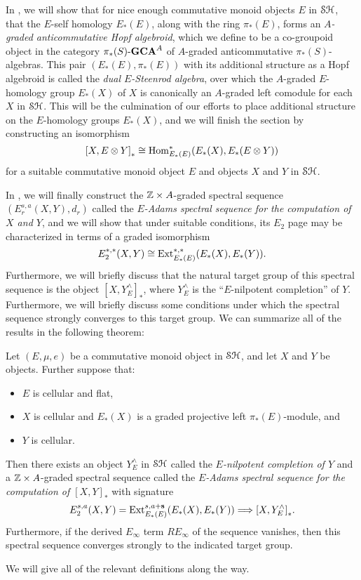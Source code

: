 \documentclass[../main.tex]{subfiles}
\begin{document}
In , we will show that for nice enough commutative monoid objects $E$ in $\mathcal{SH}$, that the $E$-self homology $E_*(E)$, along with the ring $\pi_*(E)$, forms an \emph{$A$-graded anticommutative Hopf algebroid}, which we define to be a co-groupoid object in the category $\pi_*(S)\text-\mathbf{GCA}^A$ of $A$-graded anticommutative $\pi_*(S)$-algebras. This pair $(E_*(E),\pi_*(E))$ with its additional structure as a Hopf algebroid is called the \emph{dual $E$-Steenrod algebra}, over which the $A$-graded $E$-homology group $E_*(X)$ of $X$ is canonically an $A$-graded left comodule for each $X$ in $\mathcal{SH}$. This will be the culmination of our efforts to place additional structure on the $E$-homology groups $E_*(X)$, and we will finish the section by constructing an isomorphism
\[{[X,E\otimes Y]}_*\cong\mathrm{Hom}^*_{E_*(E)}(E_*(X),E_*(E\otimes Y))\]
for a suitable commutative monoid object $E$ and objects $X$ and $Y$ in $\mathcal{SH}$.

In , we will finally construct the $\mathbb{Z}\times A$-graded spectral sequence $(E_r^{s,a}(X,Y),d_r)$ called the \emph{$E$-Adams spectral sequence for the computation of $X$ and $Y$}, and we will show that under suitable conditions, its $E_2$ page may be characterized in terms of a graded isomorphism
\[E_2^{*,*}(X,Y)\cong\mathrm{Ext}_{E_*(E)}^{*,*}(E_{*}(X),E_*(Y)).\]
Furthermore, we will briefly discuss that the natural target group of this spectral sequence is the object ${[X,Y_E^\wedge]}_*$, where $Y_E^\wedge$ is the ``$E$-nilpotent completion'' of $Y$. Furthermore, we will briefly discuss some conditions under which the spectral sequence strongly converges to this target group. We can summarize all of the results in the following theorem:
\begin{theorem}
    Let $(E,\mu,e)$ be a commutative monoid object in $\mathcal{SH}$, and let $X$ and $Y$ be objects. Further suppose that:\begin{itemize}
        \item $E$ is cellular and flat,
        \item $X$ is cellular and $E_*(X)$ is a graded projective left $\pi_*(E)$-module, and
        \item $Y$ is cellular.
    \end{itemize}
    Then there exists an object $Y^\wedge_E$ in $\mathcal{SH}$ called the \emph{$E$-nilpotent completion of $Y$} and a $\mathbb{Z}\times A$-graded spectral sequence called the \emph{$E$-Adams spectral sequence for the computation of ${[X,Y]}_*$} with signature
    \[E_2^{s,a}(X,Y)=\mathrm{Ext}^{s,a+\mathbf{s}}_{E_*(E)}(E_*(X),E_*(Y))\Longrightarrow{[X,Y^\wedge_E]}_*.\]
    Furthermore, if the derived $E_\infty$ term $RE_\infty$ of the sequence vanishes, then this spectral sequence converges strongly to the indicated target group.
\end{theorem}
We will give all of the relevant definitions along the way.
\end{document}

